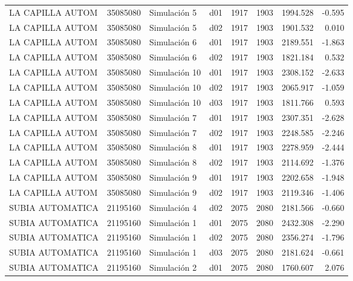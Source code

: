 \begin{landscape}
\begin{longtable}{lrlp{2cm}p{2cm}p{3cm}p{2cm}r}
        LA CAPILLA AUTOM &  35085080 &   Simulación 5 &   d01 &      1917 &     1903 &  1994.528 &    -0.595 \\
        LA CAPILLA AUTOM &  35085080 &   Simulación 5 &   d02 &      1917 &     1903 &  1901.532 &     0.010 \\
        LA CAPILLA AUTOM &  35085080 &   Simulación 6 &   d01 &      1917 &     1903 &  2189.551 &    -1.863 \\
        LA CAPILLA AUTOM &  35085080 &   Simulación 6 &   d02 &      1917 &     1903 &  1821.184 &     0.532 \\
        LA CAPILLA AUTOM &  35085080 &  Simulación 10 &   d01 &      1917 &     1903 &  2308.152 &    -2.633 \\
        LA CAPILLA AUTOM &  35085080 &  Simulación 10 &   d02 &      1917 &     1903 &  2065.917 &    -1.059 \\
        LA CAPILLA AUTOM &  35085080 &  Simulación 10 &   d03 &      1917 &     1903 &  1811.766 &     0.593 \\
        LA CAPILLA AUTOM &  35085080 &   Simulación 7 &   d01 &      1917 &     1903 &  2307.351 &    -2.628 \\
        LA CAPILLA AUTOM &  35085080 &   Simulación 7 &   d02 &      1917 &     1903 &  2248.585 &    -2.246 \\
        LA CAPILLA AUTOM &  35085080 &   Simulación 8 &   d01 &      1917 &     1903 &  2278.959 &    -2.444 \\
        LA CAPILLA AUTOM &  35085080 &   Simulación 8 &   d02 &      1917 &     1903 &  2114.692 &    -1.376 \\
        LA CAPILLA AUTOM &  35085080 &   Simulación 9 &   d01 &      1917 &     1903 &  2202.658 &    -1.948 \\
        LA CAPILLA AUTOM &  35085080 &   Simulación 9 &   d02 &      1917 &     1903 &  2119.346 &    -1.406 \\
        SUBIA AUTOMATICA &  21195160 &   Simulación 4 &   d02 &      2075 &     2080 &  2181.566 &    -0.660 \\
        SUBIA AUTOMATICA &  21195160 &   Simulación 1 &   d01 &      2075 &     2080 &  2432.308 &    -2.290 \\
        SUBIA AUTOMATICA &  21195160 &   Simulación 1 &   d02 &      2075 &     2080 &  2356.274 &    -1.796 \\
        SUBIA AUTOMATICA &  21195160 &   Simulación 1 &   d03 &      2075 &     2080 &  2181.624 &    -0.661 \\
        SUBIA AUTOMATICA &  21195160 &   Simulación 2 &   d01 &      2075 &     2080 &  1760.607 &     2.076 \\

\end{longtable}
\end{landscape}
